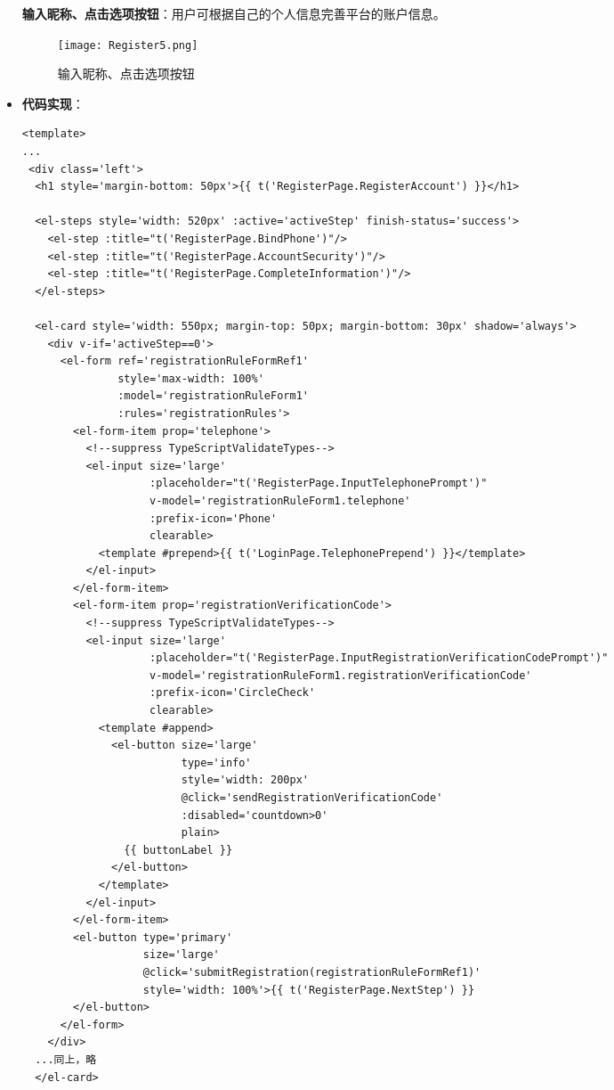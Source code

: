 \begin{itemize}
	\textbf{输入昵称、点击选项按钮}：用户可根据自己的个人信息完善平台的账户信息。

	\begin{figure}[H]
		\centering
		\texttt{[image: Register5.png]}
		\caption{输入昵称、点击选项按钮}
	\end{figure}

	\item \textbf{代码实现}：
	\begin{verbatim}
<template>
...
 <div class='left'>
  <h1 style='margin-bottom: 50px'>{{ t('RegisterPage.RegisterAccount') }}</h1>
	
  <el-steps style='width: 520px' :active='activeStep' finish-status='success'>
    <el-step :title="t('RegisterPage.BindPhone')"/>
    <el-step :title="t('RegisterPage.AccountSecurity')"/>
    <el-step :title="t('RegisterPage.CompleteInformation')"/>
  </el-steps>
	
  <el-card style='width: 550px; margin-top: 50px; margin-bottom: 30px' shadow='always'>
    <div v-if='activeStep==0'>
      <el-form ref='registrationRuleFormRef1'
               style='max-width: 100%'
               :model='registrationRuleForm1'
               :rules='registrationRules'>
        <el-form-item prop='telephone'>
          <!--suppress TypeScriptValidateTypes-->
          <el-input size='large'
                    :placeholder="t('RegisterPage.InputTelephonePrompt')"
                    v-model='registrationRuleForm1.telephone'
                    :prefix-icon='Phone'
                    clearable>
            <template #prepend>{{ t('LoginPage.TelephonePrepend') }}</template>
          </el-input>
        </el-form-item>
        <el-form-item prop='registrationVerificationCode'>
          <!--suppress TypeScriptValidateTypes-->
          <el-input size='large'
                    :placeholder="t('RegisterPage.InputRegistrationVerificationCodePrompt')"
                    v-model='registrationRuleForm1.registrationVerificationCode'
                    :prefix-icon='CircleCheck'
                    clearable>
            <template #append>
              <el-button size='large'
                         type='info'
                         style='width: 200px'
                         @click='sendRegistrationVerificationCode'
                         :disabled='countdown>0'
                         plain>
                {{ buttonLabel }}
              </el-button>
            </template>
          </el-input>
        </el-form-item>
        <el-button type='primary'
                   size='large'
                   @click='submitRegistration(registrationRuleFormRef1)'
                   style='width: 100%'>{{ t('RegisterPage.NextStep') }}
        </el-button>
      </el-form>
    </div>
  ...同上，略
  </el-card>
	

\end{verbatim}
\end{itemize}
